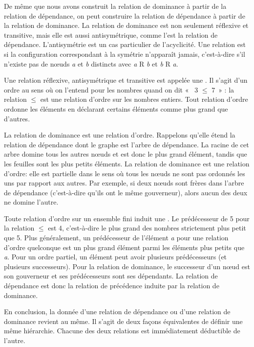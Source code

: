 {    De même que nous avons construit la relation de dominance à partir de la relation de dépendance, on peut construire la relation de dépendance à partir de la relation de dominance. La relation de dominance est non seulement réflexive et transitive, mais elle est aussi antisymétrique, comme l’est la relation de dépendance. L’antisymétrie est un cas particulier de l’acyclicité. Une relation est  si la configuration correspondant à la symétrie n’apparaît jamais, c’est-à-dire s’il n’existe pas de nœuds \textit{a} et \textit{b} distincts avec \textit{a} R \textit{b} et \textit{b} R \textit{a}.

    Une relation réflexive, antisymétrique et transitive est appelée une . Il s’agit d’un ordre au sens où on l’entend pour les nombres quand on dit «~ 3 ${\leq}$ 7~» : la relation ${\leq}$ est une relation d’ordre sur les nombres entiers. Tout relation d’ordre ordonne les éléments en déclarant certains éléments comme plus grand que d’autres.

    La relation de dominance est une relation d’ordre. Rappelons qu’elle étend la relation de dépendance dont le graphe est l’arbre de dépendance. La racine de cet arbre domine tous les autres nœuds et est donc le plus grand élément, tandis que les feuilles sont les plus petits éléments. La relation de dominance est une relation d’ordre: elle est partielle dans le sens où tous les nœuds ne sont pas ordonnés les uns par rapport aux autres. Par exemple, si deux nœuds sont frères dans l’arbre de dépendance (c’est-à-dire qu’ils ont le même gouverneur), alors aucun des deux ne domine l’autre.

    Toute relation d’ordre sur un ensemble fini induit une . Le prédécesseur de 5 pour la relation ${\leq}$ est 4, c’est-à-dire le plus grand des nombres strictement plus petit que 5. Plus généralement, un prédécesseur de l’élément \textit{a} pour une relation d’ordre quelconque est un plus grand élément parmi les éléments plus petits que \textit{a}. Pour un ordre partiel, un élément peut avoir plusieurs prédécesseurs (et plusieurs successeurs). Pour la relation de dominance, le successeur d’un nœud est son gouverneur et ses prédécesseurs sont ses dépendants. La relation de dépendance est donc la relation de précédence induite par la relation de dominance.

    En conclusion, la donnée d’une relation de dépendance ou d’une relation de dominance revient au même. Il s’agit de deux façons équivalentes de définir une même hiérarchie. Chacune des deux relations est immédiatement déductible de l’autre.
}

